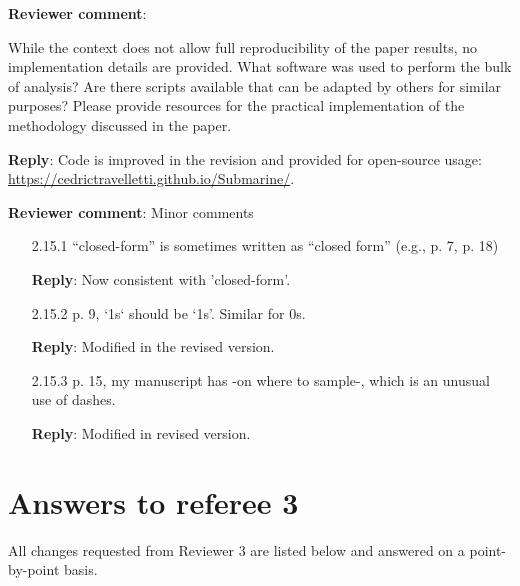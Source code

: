 \documentclass[a4paper]{article}
\newcounter{reviewer}
\def\revcom{\textbf{Reviewer comment}}
\def\reply{\textbf{Reply}}
\begin{document}
\begin{answers}
\item{\revcom :}\label{r2c14}

While the context does not allow full reproducibility of the paper results, no implementation details are provided. What software was used to perform the bulk of analysis? Are there scripts available that can be adapted by others for similar purposes? Please provide resources for the practical implementation of the methodology discussed in the paper.

\reply: Code is improved in the revision and provided for open-source usage: \url{https://cedrictravelletti.github.io/Submarine/}. 

\item{\revcom: Minor comments}\label{r2cminor}

\begin{itemize}[noitemsep,topsep=0pt,parsep=0pt,partopsep=0pt]

\item[2.15.1] “closed-form” is sometimes written as “closed form” (e.g., p. 7, p. 18)

\reply: Now consistent with 'closed-form'.

\item[2.15.2] p. 9, `1s` should be ‘1s’. Similar for 0s.

\reply: Modified in the revised version.

\item[2.15.3] p. 15, my manuscript has -on where to sample-, which is an unusual use of dashes.

\reply: Modified in revised version.

\end{itemize}

\end{answers}

\section*{Answers to referee 3}
All changes requested from Reviewer 3 are listed below and answered on a point-by-point basis.

\setcounter{reviewer}{3}
\end{document}
